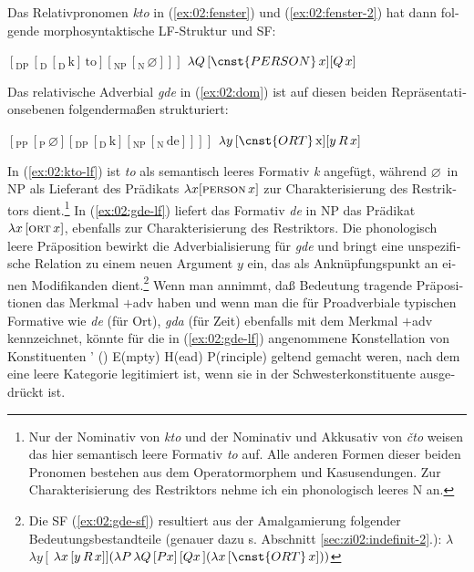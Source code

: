 \documentclass[output=paper, colorlinks, citecolor=brown, booklanguage=german]{langscibook}
\begin{document}
\begin{otherlanguage}{german}
Das Relativpronomen \textit{kto} in (\ref{ex:02:fenster}) und (\ref{ex:02:fenster-2}) hat dann folgende morpho\-syn\-tak\-ti\-sche LF-Struktur und SF:

\newpage
\ea
    \ea\label{ex:02:kto-lf} $[_\textrm{DP}\, [_\textrm{D}\, [_\textrm{D}\, \textrm{k} ]\, \textrm{to} ] [_\textrm{NP}\, [_\textrm{N}\, \varnothing ]]]$
    \ex\label{ex:02:kto-sf} $\lambda Q\, [\cnst{PERSON}\, x] [ Q\, x ]$
    \z
\z 

\noindent Das relativische Adverbial \textit{gde} in (\ref{ex:02:dom}) ist auf diesen beiden Repräsentationsebenen folgendermaßen strukturiert:

\ea
    \ea\label{ex:02:gde-lf} $[_\textrm{PP}\, [_\textrm{P}\, \varnothing ][_\textrm{DP}\, [_\textrm{D}\, \textrm{k} ] [_\textrm{NP}\, [_\textrm{N}\, \textrm{de} ]]]]$
    \ex\label{ex:02:gde-sf} $\lambda y\, [\cnst{ORT}\, \textrm{x} ] [ y\, R\, x ]$
\z\z 

\noindent In (\ref{ex:02:kto-lf}) ist \textit{to} als semantisch leeres Formativ \textit{k} angefügt, während $\varnothing\,$ in NP als Lieferant des Prädikats $\lambda x [\textsc{person}\, x ]$ zur Charakterisierung des Restriktors \mbox{dient}.\footnote{Nur der Nominativ von \textit{kto} und der Nominativ und Akkusativ von \textit{čto} weisen das hier semantisch leere Formativ \textit{to} auf. Alle anderen Formen dieser beiden Pronomen bestehen aus dem Operatormorphem und Kasusendungen. Zur Charakterisierung des Restriktors nehme ich ein phonologisch leeres N an.} In (\ref{ex:02:gde-lf}) liefert das Formativ \textit{de} in NP das Prädikat $\lambda x\, [\textsc{ort}\, x ]$, ebenfalls zur Charakterisierung des Restriktors. Die phonologisch leere Präposition bewirkt die Adverbialisierung für \textit{gde} und bringt eine unspezifische Relation zu einem neuen Argument $y$ ein, das als Anknüpfungspunkt an einen Modifikanden \mbox{dient}.\footnote{\label{fn:10} Die SF (\ref{ex:02:gde-sf}) resultiert aus der Amalgamierung folgender Bedeutungsbestandteile (genauer dazu s. Abschnitt \ref{sec:zi02:indefinit-2}.):
    \ea $\lambda$ $\lambda y\, [$ $\lambda x\, [ y\, R\, x ]] (\lambda P\, \lambda Q\, [P x] \, [ Q x\, ] (\lambda x\, [\cnst{ORT}\, x]))$
    \z 
} Wenn man annimmt, daß Bedeutung tragende Präpositionen das Merkmal $+$adv haben und wenn man die für Proadverbiale typischen Formative wie \textit{de} (für Ort), \textit{gda} (für Zeit) ebenfalls mit dem Merkmal $+$adv kennzeichnet, könnte für die in (\ref{ex:02:gde-lf}) angenommene Konstellation von Konstituenten \citeauthor{zi02:Emonds1987}' (\citeyear{zi02:Emonds1987}) E(mpty) H(ead) P(rinciple) geltend gemacht weren, nach dem eine leere Kategorie legitimiert ist, wenn sie in der Schwesterkonstituente ausgedrückt ist.


\end{otherlanguage}
\end{document}

